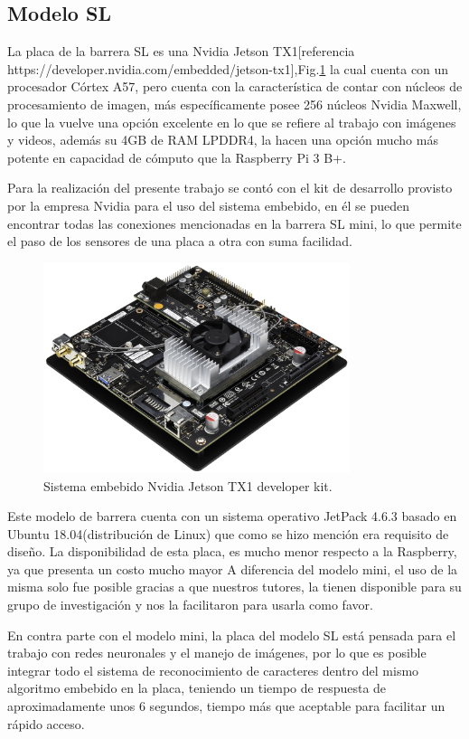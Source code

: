 \subsection{Modelo SL}
La placa de la barrera SL es una Nvidia Jetson TX1[referencia https://developer.nvidia.com/embedded/jetson-tx1],Fig.\ref{fig:JTX1} la cual cuenta con un procesador Córtex A57, pero
cuenta con la característica de contar con núcleos de procesamiento de imagen, más específicamente posee 256 núcleos Nvidia Maxwell,
lo que la vuelve una opción excelente en lo que se refiere al trabajo con imágenes y videos, además su 4GB de RAM LPDDR4,
la hacen una opción mucho más potente en capacidad de cómputo que la Raspberry Pi 3 B+.


Para la realización del presente trabajo se contó con el kit de desarrollo provisto por la empresa Nvidia para el uso
del sistema embebido, en él se pueden encontrar todas las conexiones mencionadas en la barrera SL mini, lo que permite
el paso de los sensores de una placa a otra con suma facilidad.

\begin{figure}
    \centering
    \includegraphics[width=0.8\textwidth]{imgs/JTX1-developerkit.png}
    \caption{Sistema embebido Nvidia Jetson TX1 developer kit.}
    \label{fig:JTX1}
\end{figure}
Este modelo de barrera cuenta con un sistema operativo JetPack 4.6.3 basado en Ubuntu 18.04(distribución de Linux) que 
como se hizo mención era requisito de diseño.
La disponibilidad de esta placa, es mucho menor respecto a la Raspberry, ya que presenta un costo mucho mayor 
A diferencia del modelo mini, el uso de la misma solo fue posible gracias a que nuestros tutores, la tienen disponible 
para su grupo de investigación y nos la facilitaron para usarla como favor.

En contra parte con el modelo mini, la placa del modelo SL está pensada para el trabajo con redes neuronales y el manejo 
de imágenes, por lo que es posible integrar todo el sistema de reconocimiento de caracteres dentro del mismo algoritmo embebido 
en la placa, teniendo un tiempo de respuesta de aproximadamente unos 6 segundos, tiempo más que aceptable para facilitar un rápido
acceso.

